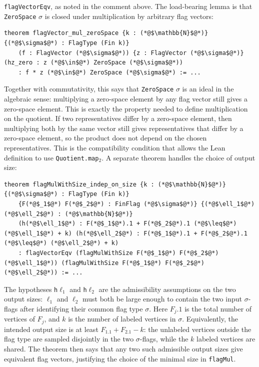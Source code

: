 \documentclass{article}
\newcommand{\lean}[1]{\texttt{#1}}
\begin{document}
\lean{flagVectorEqv}, as noted in the comment above.  The load-bearing lemma
is that \lean{ZeroSpace} $\sigma$ is
closed under multiplication by arbitrary flag vectors:
\begin{lstlisting}
theorem flagVector_mul_zeroSpace {k : (*@$\mathbb{N}$@*)} {(*@$\sigma$@*) : FlagType (Fin k)}
    (f : FlagVector (*@$\sigma$@*)) {z : FlagVector (*@$\sigma$@*)} (hz_zero : z (*@$\in$@*) ZeroSpace (*@$\sigma$@*))
    : f * z (*@$\in$@*) ZeroSpace (*@$\sigma$@*) := ...
\end{lstlisting}
Together with commutativity, this says that \lean{ZeroSpace} $\sigma$ is an
ideal in the algebraic sense: multiplying a zero-space element by any flag
vector still gives a zero-space element.  This is exactly the property needed
to define multiplication on the quotient.  If two representatives differ by a
zero-space element, then multiplying both by the same vector still gives
representatives that differ by a zero-space element, so the product does not
depend on the chosen representatives.  This is the compatibility condition
that allows the Lean definition to use \lean{Quotient.map$_2$}.  A separate
theorem handles the choice of output size:
\begin{lstlisting}
theorem flagMulWithSize_indep_on_size {k : (*@$\mathbb{N}$@*)} {(*@$\sigma$@*) : FlagType (Fin k)}
    {F(*@$_1$@*) F(*@$_2$@*) : FinFlag (*@$\sigma$@*)} {(*@$\ell_1$@*) (*@$\ell_2$@*) : (*@$\mathbb{N}$@*)}
    (h(*@$\ell_1$@*) : F(*@$_1$@*).1 + F(*@$_2$@*).1 (*@$\leq$@*) (*@$\ell_1$@*) + k) (h(*@$\ell_2$@*) : F(*@$_1$@*).1 + F(*@$_2$@*).1 (*@$\leq$@*) (*@$\ell_2$@*) + k)
    : flagVectorEqv (flagMulWithSize F(*@$_1$@*) F(*@$_2$@*) (*@$\ell_1$@*)) (flagMulWithSize F(*@$_1$@*) F(*@$_2$@*) (*@$\ell_2$@*)) := ...
\end{lstlisting}
The hypotheses \lean{h$\ell_1$} and \lean{h$\ell_2$} are the admissibility
assumptions on the two output sizes: \(\ell_1\) and \(\ell_2\) must both be
large enough to contain the two input $\sigma$-flags after identifying their common flag
type \(\sigma\).  Here \(F_j.1\) is the total number of vertices of \(F_j\),
and \(k\) is the number of labeled vertices in \(\sigma\).  Equivalently, the intended output
size is at least \(F_1.1 + F_2.1 - k\): the unlabeled vertices outside the flag
type are sampled disjointly in the two $\sigma$-flags, while the \(k\) labeled vertices
are shared.  The theorem then says that any two such admissible output sizes
give equivalent flag vectors, justifying the choice of the minimal size in
\lean{flagMul}.
\end{document}
